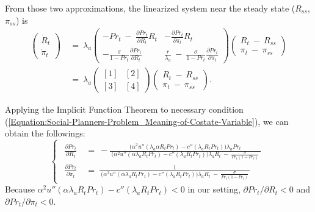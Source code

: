 From those two approximations, the linearized system near the steady state ($R_{ss}$, $\pi_{ss}$) is
\begin{equation*}
\begin{split}
    \begin{pmatrix}
        \dot{R}_{t} \\
        \dot{\pi}_{t}
    \end{pmatrix} \ 
    & = \ 
    \lambda_{a} 
    \begin{pmatrix}
        -Pr_{t} \ - \ \frac{\partial Pr_{t}}{\partial R_{t}} R_{t} & -\frac{\partial Pr_{t}}{\partial \pi_{t}} R_{t} \\
        -\frac{\sigma}{1 - Pr_{t}} \frac{\partial Pr_{t}}{\partial R_{t}} & \frac{r}{\lambda_{a}} \ - \ \frac{\sigma}{1 - Pr_{t}} \frac{\partial Pr_{t}}{\partial \pi_{t}}
    \end{pmatrix}
    \begin{pmatrix}
        R_{t} \ - \ R_{ss} \\
        \pi_{t} \ - \ \pi_{ss}
    \end{pmatrix} \\
    & = \
    \lambda_{a} 
    \begin{pmatrix}
        [1] & [2] \\
        [3] & [4]
    \end{pmatrix}
    \begin{pmatrix}
        R_{t} \ - \ R_{ss} \\
        \pi_{t} \ - \ \pi_{ss}
    \end{pmatrix}.
\end{split}
\end{equation*}

Applying the Implicit Function Theorem to necessary condition (\ref{Equation:Social-Planners-Problem_Meaning-of-Costate-Variable}), we can obtain the followings:
\begin{equation*}
\begin{cases}
    \begin{split}
        \frac{\partial Pr_{t}}{\partial R_{t}} \ 
        & = \ - \frac{ \big( \alpha^{2} u''(\lambda_{a} \alpha R_{t} Pr_{t}) - c''(\lambda_{a} R_{t} Pr_{t}) \big) \lambda_{a} Pr_{t}}{ \ \big( \alpha^{2} u''(\alpha \lambda_{a} R_{t} Pr_{t}) - c''(\lambda_{a} R_{t} Pr_{t}) \big) \lambda_{a} R_{t} \ - \ \frac{\sigma}{Pr_{t}(1 - Pr_{t})} \ } \\
        \frac{\partial Pr_{t}}{\partial \pi_{t}} \
        & = \ \frac{1}{ \ \big( \alpha^{2} u''(\alpha \lambda_{a} R_{t} Pr_{t}) - c''(\lambda_{a} R_{t} Pr_{t}) \big) \lambda_{a} R_{t} \ - \ \frac{\sigma}{Pr_{t}(1 - Pr_{t})} \ } 
    \end{split}
\end{cases}
\end{equation*}
Because $\alpha^{2} u''(\alpha \lambda_{a} R_{t} Pr_{t}) - c''(\lambda_{a} R_{t} Pr_{t}) < 0$ in our setting, $\partial Pr_{t} / \partial R_{t} < 0$ and $\partial Pr_{t} / \partial \pi_{t} < 0$.

